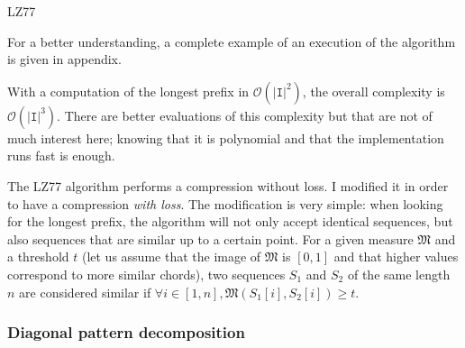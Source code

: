 \documentclass[a4paper,10pt]{article}
\newcommand{\bigO}[1]{\mathcal O\left( #1 \right)}
\begin{document}
\begin{algorithm}
\caption{LZ77 \label{algolz77}}
       
   


\end{algorithm}


For a better understanding, a complete example of an execution of the algorithm is given in appendix.

With a computation of the longest prefix in $\bigO{|\texttt{I}|^2}$, the overall complexity is $\bigO{|\texttt{I}|^3}$. There are better evaluations of this complexity but that are not of much interest here; knowing that it is polynomial and that the implementation runs fast is enough.

The LZ77 algorithm performs a compression without loss. I modified it in order to have a compression \emph{with loss}. The modification is very simple: when looking for the longest prefix, the algorithm will not only accept identical sequences, but also sequences that are similar up to a certain point. For a given measure $\mathfrak{M}$ and a threshold $t$ (let us assume that the image of $\mathfrak{M}$ is $[0,1]$ and that higher values correspond to more similar chords), two sequences $S_1$ and $S_2$ of the same length $n$ are considered similar if $\forall i \in [1,n], \mathfrak{M}(S_1[i],S_2[i]) \geq t$.


\subsubsection{Diagonal pattern decomposition}
\label{compressiondiagonal}
\end{document}
